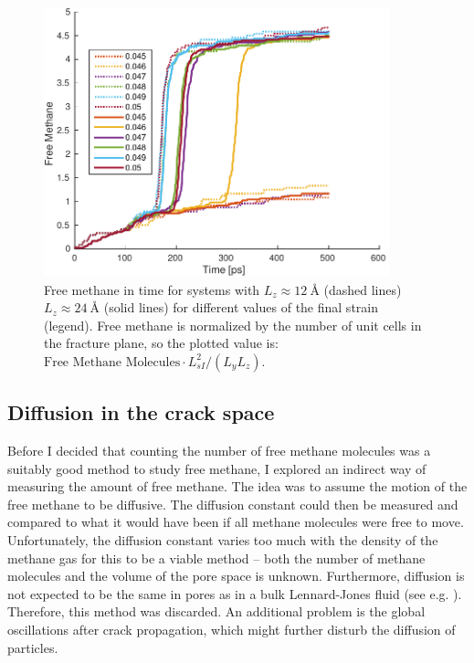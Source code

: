 \begin{figure}
\centering
\includegraphics[width=10cm]{../figures/thesis/free_methane_nz1_nz2.pdf}
\caption{Free methane in time for systems with $L_z \approx \SI{12}{\angstrom}$ (dashed lines) $L_z\approx \SI{24}{\angstrom}$ (solid lines) for different values of the final strain (legend). Free methane is normalized by the number of unit cells in the fracture plane, so the plotted value is: $\text{Free Methane Molecules}\cdot L_{sI}^2/(L_yL_z)$.}
\label{fig:free_methane_diff_l}
\end{figure}

\subsection{Diffusion in the crack space}
Before I decided that counting the number of free methane molecules was a suitably good method to study free methane, I explored an indirect way of measuring the amount of free methane. The idea was to assume the motion of the free methane to be diffusive. The diffusion constant could then be measured and compared to what it would have been if all methane molecules were free to move. Unfortunately, the diffusion constant varies too much with the density of the methane gas for this to be a viable method -- both the number of methane molecules and the volume of the pore space is unknown. Furthermore, diffusion is not expected to be the same in pores as in a bulk Lennard-Jones fluid (see e.g. \citet[p. 18]{Pozhar:1668293}). Therefore, this method was discarded. An additional problem is the global oscillations after crack propagation, which might further disturb the diffusion of particles. 

